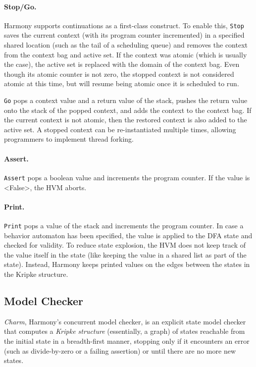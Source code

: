 \documentclass[twocolumn]{article}
\begin{document}
\paragraph{Stop/Go.}  Harmony supports continuations as a first-class
construct.  To enable this, \texttt{Stop} saves the current context
(with its program counter incremented) in a specified shared location
(such as the tail of a scheduling queue) and removes the context
from the context bag and active set.  If the context was atomic
(which is usually the case), the active set is replaced with the
domain of the context bag.  Even though its atomic counter is not
zero, the stopped context is not considered atomic at this time,
but will resume being atomic once it is scheduled to run.

\texttt{Go} pops a context value and a return value of the stack,
pushes the return value onto the stack of the popped context, and adds
the context to the context bag.  If the current context is not atomic,
then the restored context is also added to the active set.
A stopped context can be re-instantiated multiple times, allowing
programmers to implement thread forking.

\paragraph{Assert.}  \texttt{Assert} pops a boolean value and increments
the program counter.  If the value is <{False}>, the HVM aborts.

\paragraph{Print.}  \texttt{Print} pops a value of the stack and increments
the program counter.  In case a behavior automaton has been specified, the
value is applied to the DFA state and checked for validity.
To reduce state explosion, the HVM does not keep track of the value itself
in the state (like keeping the value in a shared list as part of the state).
Instead, Harmony keeps printed values on the edges between the states
in the Kripke structure.

\subsection{Model Checker}

\emph{Charm}, Harmony's concurrent model checker, is an explicit state model
checker that computes a \emph{Kripke structure} (essentially, a graph)
of states reachable
from the initial state in a breadth-first manner, stopping only if
it encounters an error (such as divide-by-zero or a failing assertion)
or until there are no more new states.
\end{document}

